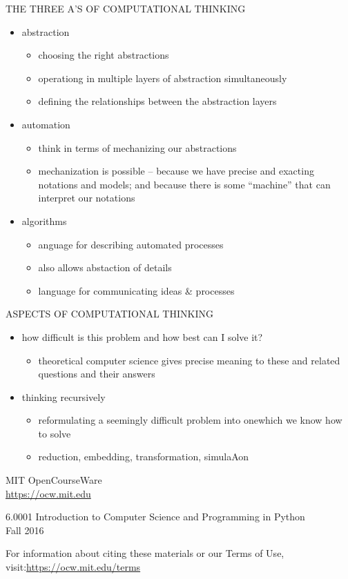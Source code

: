 \documentclass[aspectratio=169]{beamer}
\begin{document}
\begin{frame}{THE THREE A’S OF COMPUTATIONAL THINKING}
\begin{itemize}
\item abstraction
\begin{itemize}
\item choosing the right abstractions
\item operationg in multiple layers of abstraction simultaneously
\item defining the relationships between the abstraction layers
\end{itemize}
\item automation
\begin{itemize}
\item think in terms of mechanizing our abstractions
\item mechanization is possible – because we have precise and exacting notations and models; and because there is some “machine” that can interpret our notations
\end{itemize}
\item algorithms
\begin{itemize}
\item anguage for describing automated processes
\item also allows abstaction of details
\item language for communicating ideas \& processes
\end{itemize}
\end{itemize}
\end{frame}

\begin{frame}{ASPECTS OF COMPUTATIONAL THINKING}
\begin{itemize}
\item how difficult is this problem and how best can I solve it?
\begin{itemize}
\item theoretical computer science gives precise meaning to these
and related questions and their answers
\end{itemize}
\item thinking recursively
\begin{itemize}
\item reformulating a seemingly difficult problem into onewhich we know how to solve
\item reduction, embedding, transformation, simulaAon

\end{itemize}
\end{itemize}
\end{frame}

\begin{frame}
MIT OpenCourseWare\\
\url{https://ocw.mit.edu}
\par
\vspace{1cm}
6.0001 Introduction to Computer Science and Programming in Python\\
Fall 2016\\
\par
\vspace{2cm}
For information about citing these materials or our Terms of Use, visit:\url{https://ocw.mit.edu/terms}

\end{frame}
\end{document}
